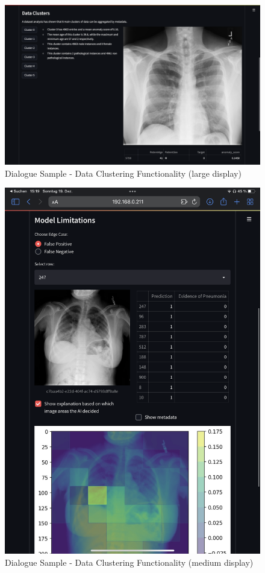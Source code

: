 \documentclass[11pt,a4paper,english]{scrreprt}
\begin{document}
\begin{figure}[htbp]
    \centering
    \includegraphics[width=\textwidth]{img/screenshots/samples/large/l_data_clusters.png}
    \caption{Dialogue Sample - Data Clustering Functionality (large display)}
    \label{fig:samples_l_data_cluster}
\end{figure}

\begin{figure}[htbp]
    \centering
    \includegraphics[width=\textwidth]{img/screenshots/samples/medium/m_limits.PNG}
    \caption{Dialogue Sample - Data Clustering Functionality (medium display)}
    \label{fig:samples_m_limits}
\end{figure}
\end{document}
